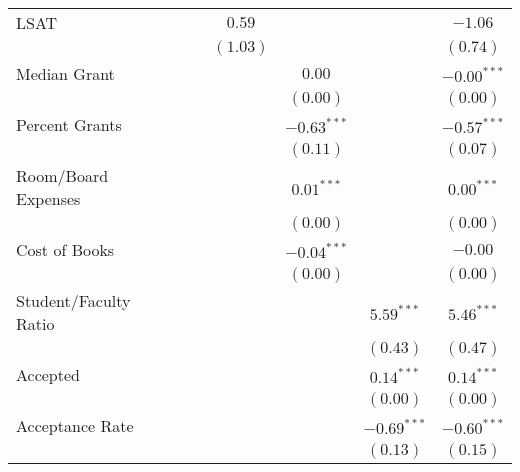 \begin{table}
\begin{center}
\begin{tabular}{l c c c c c c }
LSAT                  &                &                & $0.59$          &                &                & $-1.06$        \\
                      &                &                & $(1.03)$        &                &                & $(0.74)$       \\
Median Grant          &                &                &                 & $0.00$         &                & $-0.00^{***}$  \\
                      &                &                &                 & $(0.00)$       &                & $(0.00)$       \\
Percent Grants        &                &                &                 & $-0.63^{***}$  &                & $-0.57^{***}$  \\
                      &                &                &                 & $(0.11)$       &                & $(0.07)$       \\
Room/Board Expenses   &                &                &                 & $0.01^{***}$   &                & $0.00^{***}$   \\
                      &                &                &                 & $(0.00)$       &                & $(0.00)$       \\
Cost of Books         &                &                &                 & $-0.04^{***}$  &                & $-0.00$        \\
                      &                &                &                 & $(0.00)$       &                & $(0.00)$       \\
Student/Faculty Ratio &                &                &                 &                & $5.59^{***}$   & $5.46^{***}$   \\
                      &                &                &                 &                & $(0.43)$       & $(0.47)$       \\
Accepted              &                &                &                 &                & $0.14^{***}$   & $0.14^{***}$   \\
                      &                &                &                 &                & $(0.00)$       & $(0.00)$       \\
Acceptance Rate       &                &                &                 &                & $-0.69^{***}$  & $-0.60^{***}$  \\
                      &                &                &                 &                & $(0.13)$       & $(0.15)$       \\

\end{tabular}
\end{center}
\end{table}
